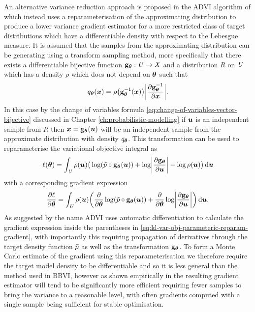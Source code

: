 An alternative variance reduction approach is proposed in the \ac{ADVI} algorithm of \citep{kucukelbir2016automatic} which instead uses a reparameterisation of the approximating distribution to produce a lower variance gradient estimator for a more restricted class of target distributions which have a differentiable density with respect to the Lebesgue measure.  It is assumed that the samples from the approximating distribution can be generating using a transform sampling method, more specifically that there exists a differentiable bijective function ${\mathbf{g}}_{\boldsymbol{\theta}} : \mathit{U} \to \mathit{X}$ and a distribution $R$ on $\mathit{U}$ which has a density $\rho$ which does not depend on $\boldsymbol{\theta}$ such that
\begin{equation}
  q_{\vct{\theta}}(\vct{x}) = \rho\lpa\vctfunc{g}_{\vct{\theta}}^{-1}(\vct{x})\rpa \left|\pd{\vctfunc{g}_{\vct{\theta}}^{-1}}{\vct{x}}\right|.
\end{equation}
In this case by the change of variables formula \eqref{eq:change-of-variables-vector-bijective} discussed in Chapter \ref{ch:probabilistic-modelling} if $\boldsymbol{u}$ is an independent sample from $R$ then $\boldsymbol{x} = {\mathbf{g}}_{\boldsymbol{\theta}}(\boldsymbol{u})$ will be an independent sample from the approximate distribution with density $q_{\boldsymbol{\theta}}$. This transformation can be used to reparameterise the variational objective integral as
\begin{equation}\label{eq:kl-var-obj-parameteric-reparam}
  \ell(\vct{\theta}) = 
  \int_{\set{U}} \rho(\vct{u}) \big(
    \log\lpa\utgtdens\circ\vctfunc{g}_{\vct{\theta}}(\vct{u})\rpa +
    \log\left|\pd{\vctfunc{g}_{\vct{\theta}}}{\vct{u}}\right| - \log\rho(\vct{u})
  \big)
  \,\dr\vct{u}
\end{equation}
with a corresponding gradient expression
\begin{equation}\label{eq:kl-var-obj-parameteric-reparam-gradient}
  \pd{\ell}{\vct{\theta}} = 
  \int_{\set{U}} \rho(\vct{u}) \lpa
    \pd{}{\vct{\theta}}\log\lpa\utgtdens\circ\vctfunc{g}_{\vct{\theta}}(\vct{u})\rpa +
    \pd{}{\vct{\theta}}\log\left|\pd{\vctfunc{g}_{\vct{\theta}}}{\vct{u}}\right|
  \rpa
  \,\dr\vct{u}.
\end{equation}
As suggested by the name \ac{ADVI} uses automatic differentiation to calculate the gradient expression inside the parentheses in \eqref{eq:kl-var-obj-parameteric-reparam-gradient}, with importantly this requiring propagation of derivatives through the target density function $\tilde{p}$ as well as the transformation ${\mathbf{g}}_{\boldsymbol{\theta}}$. To form a Monte Carlo estimate of the gradient using this reparameterisation we therefore require the target model density to be differentiable and so it is less general than the method used in \ac{BBVI}, however as shown empirically in \citep{kucukelbir2016automatic} the resulting gradient estimator will tend to be significantly more efficient requiring fewer samples to bring the variance to a reasonable level, with often gradients computed with a single sample being sufficient for stable optimisation.

